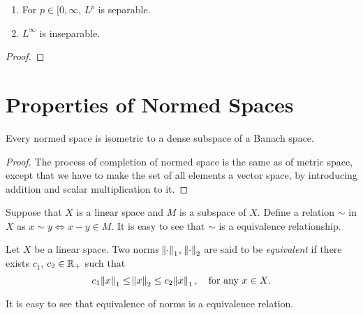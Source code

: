 \begin{thm}
\begin{enumerate}
    \item For $p \in [0, \infty$, $L^p$ is separable. 
    \item $L^\infty$ is inseparable. 
\end{enumerate}
\end{thm}
\begin{proof}

\end{proof}

\section{Properties of Normed Spaces}
\begin{thm}
Every normed space is isometric to a dense subspace of a Banach space. 
\end{thm}
\begin{proof}
The process of completion of normed space is the same as of metric space, 
except that we have to make the set of all elements a vector space, by 
introducing addition and scalar multiplication to it. 
\end{proof}

Suppose that $X$ is a linear space and $M$ is a subspace of $X$. 
Define a relation $\sim$ in $X$ as $x \sim y \iff x - y \in M$. 
It is easy to see that $\sim$ is a equivalence relationship. 

\begin{defn}
Let $X$ be a linear space. 
Two norms $\norm{\mathord{\cdot}}_1$, $\norm{\mathord{\cdot}}_2$ are said to be 
\emph{equivalent} if there exists $c_1$, $c_2 \in \mathbb{R}_+$ such that 
\begin{equation*}
    c_1 \norm{x}_1 \le \norm{x}_2 \le c_2 \norm{x}_1, \quad 
    \text{for any } x \in X. 
\end{equation*}
\end{defn}
It is easy to see that equivalence of norms is a equivalence relation. 

